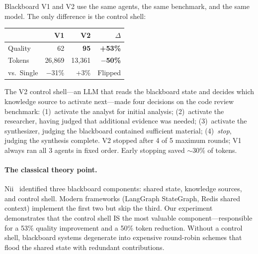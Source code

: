 \documentclass{article}
\begin{document}
%
%
%
%
%

Blackboard V1 and V2 use the same agents, the same benchmark, and the same model. The
only difference is the control shell:

\begin{center}
\small
\begin{tabular}{@{} l r r r @{}}
\toprule
& \textbf{V1} & \textbf{V2} & \textbf{$\Delta$} \\
\midrule
Quality & 62 & \textbf{95} & \textbf{+53\%} \\
Tokens & 26,869 & 13,361 & \textbf{$-$50\%} \\
vs.\ Single & $-$31\% & +3\% & Flipped \\
\bottomrule
\end{tabular}
\end{center}

\noindent
The V2 control shell---an LLM that reads the blackboard state and decides which
knowledge source to activate next---made four decisions on the code review benchmark:
(1)~activate the analyst for initial analysis; (2)~activate the researcher, having
judged that additional evidence was needed; (3)~activate the synthesizer, judging
the blackboard contained sufficient material; (4)~\emph{stop}, judging the synthesis
complete. V2 stopped after 4 of 5 maximum rounds; V1 always ran all 3 agents in
fixed order. Early stopping saved ${\sim}30\%$ of tokens.

\paragraph{The classical theory point.}
Nii~\citep{nii1986blackboard} identified three blackboard components: shared state,
knowledge sources, and control shell. Modern frameworks (LangGraph StateGraph, Redis
shared context) implement the first two but skip the third. Our experiment demonstrates
that the control shell IS the most valuable component---responsible for a 53\%
quality improvement and a 50\% token reduction. Without a control shell, blackboard
systems degenerate into expensive round-robin schemes that flood the shared state with
redundant contributions.
\end{document}
